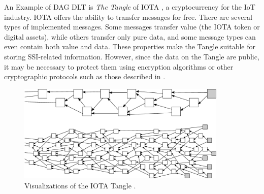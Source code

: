 An Example of DAG DLT is \textit{The Tangle} of IOTA \cite{popov2018tangle}, a cryptocurrency for the IoT industry. IOTA offers the ability to transfer messages for free. There are several types of implemented messages. Some messages transfer value (the IOTA token or digital assets), while others transfer only pure data, and some message types can even contain both value and data. These properties make the Tangle suitable for storing SSI-related information. However, since the data on the Tangle are public, it may be necessary to protect them using encryption algorithms or other cryptographic protocols such as those described in \cite{iota-streams, ac1}.

\begin{figure}[h!]
    \centering 
    \includegraphics[width=10cm]{./chapters/images/tangle.png}
    \caption{Visualizations of the IOTA Tangle \cite{popov2018tangle}.}
    \label{tangleFigure}
\end{figure}

